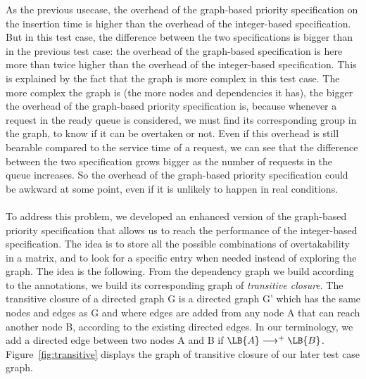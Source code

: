 \documentclass[11pt]{report}
\begin{document}
As the previous usecase, the overhead of the graph-based priority specification on the insertion time is higher than the overhead of the integer-based specification. But in this test case, the difference between the two specifications is bigger than in the previous test case: the overhead of the graph-based specification is here more than twice higher than the overhead of the integer-based specification.
This is explained by the fact that the graph is more complex in this test case. The more complex the graph is (the more nodes and dependencies it has), the bigger the overhead of the graph-based priority specification is, because whenever a request in the ready queue is considered, we must find its corresponding group in the graph, to know if it can be overtaken or not.
Even if this overhead is still bearable compared to the service time of a request, we can see that the difference between the two specification grows bigger as the number of requests in the queue increases. So the overhead of the graph-based priority specification could be awkward at some point, even if it is unlikely to happen in real conditions.

\paragraph{}
To address this problem, we developed an enhanced version of the graph-based priority specification that allows us to reach the performance of the integer-based specification. The idea is to store all the possible combinations of overtakability in a matrix, and to look for a specific entry when needed instead of exploring the graph. 
The idea is the following. From the dependency graph we build according to the annotations, we build its corresponding graph of \emph{transitive closure}. The transitive closure of a directed graph G is a directed graph G' which has the same nodes and edges as G and where edges are added from any node A that can reach another node B, according to the existing directed edges. In our terminology, we add a directed edge between two nodes A and B if $\LB{A}\longrightarrow^{+}\LB{B}$. Figure~\ref{fig:transitive} displays the graph of transitive closure of our later test case graph.
\end{document}
